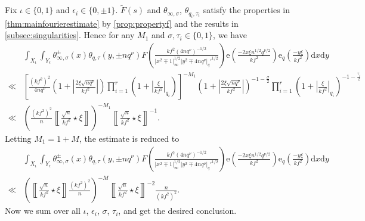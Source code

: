 \documentclass[10pt,oneside,reqno]{amsart}
\makeatletter
\newcommand\rmd{\mathrm{d}}
\newcommand\rme{\mathrm{e}}
\newcommand\legendresymbol[2]{\genfrac{(}{)}{}{}{#1}{#2}}
\theoremstyle{THEOREM}
\theoremstyle{DEFINITION}
\theoremstyle{EXERCISE}
\numberwithin{equation}{section}
\renewenvironment{proof}[1][\proofname]{\par
  \vspace{-6pt}
  \pushQED{\qed}
  \normalfont \topsep6\p@\@plus6\p@\relax
  \trivlist
  \item[\hskip\labelsep\rmfamily\bfseries
    #1\@addpunct{:}]\ignorespaces
}{
  \popQED\endtrivlist\@endpefalse
  \vspace{-6pt}
}
\makeatother
\begin{document}
\begin{proof}
Fix $\iota\in\{0,1\}$ and $\epsilon_i\in \{0,\pm 1\}$.
$\widetilde{F}(s)$ and $\theta_{\infty,\sigma}$, $\theta_{q_i,\tau_i}$ satisfy the properties in \autoref{thm:mainfourierestimate} by \autoref{prop:propertyf} and the results in \autoref{subsec:singularities}. Hence for any $M_1$ and $\sigma,\tau_i\in \{0,1\}$, we have
\begin{align*}
&\int_{X_\iota}\int_{Y_\epsilon}\theta_{\infty,\sigma}^\pm(x)\theta_{q,\tau}(y,\pm nq^\nu) F\legendresymbol{kf^2(4nq^\nu)^{-1/2}}{|x^2\mp 1|_\infty^{1/2}|y^2\mp 4nq^\nu|_q'^{1/2}} \rme\legendresymbol{-2x\xi n^{1/2}q^{\nu/2}}{kf^2}\rme_{q}\legendresymbol{-y\xi}{kf^2}\rmd x\rmd y\\
\ll &\left[\frac{(kf^2)^2}{4nq^\nu}\left(1+\left|\frac{2\xi\sqrt{nq^\nu}}{kf^2}\right|\right) \prod_{i=1}^{r}\left(1+\left|\frac{\xi}{kf^2}\right|_{q_i}\right)\right]^{-M_1} \left(1+\left|\frac{2\xi\sqrt{nq^\nu}}{kf^2}\right|\right)^{-1-\frac{\sigma}{2}} \prod_{i=1}^{r}\left(1+\left|\frac{\xi}{kf^2}\right|_{q_i}\right)^{-1-\frac{\tau_i}{2}}\\
\ll & \left(\frac{(kf^2)^2}{n}\left\llbracket\frac{\sqrt{n}}{kf^2}\star \xi\right\rrbracket\right) ^{-M_1}\left\llbracket\frac{\sqrt{n}}{kf^2}\star \xi\right\rrbracket^{-1}.
\end{align*}
Letting $M_1=1+M$, the estimate is reduced to
\begin{align*}
&\int_{X_\iota}\int_{Y_\epsilon}\theta_{\infty,\sigma}^\pm(x)\theta_{q,\tau}(y,\pm nq^\nu) F\legendresymbol{kf^2(4nq^\nu)^{-1/2}}{|x^2\mp 1|_\infty^{1/2}|y^2\mp 4nq^\nu|_q'^{1/2}} \rme\legendresymbol{-2x\xi n^{1/2}q^{\nu/2}}{kf^2}\rme_{q}\legendresymbol{-y\xi}{kf^2}\rmd x\rmd y\\
\ll &\left(\left\llbracket\frac{\sqrt{n}}{kf^2}\star \xi\right\rrbracket\frac {(kf^2)^2}{n}\right)^{-M}\left\llbracket\frac{\sqrt{n}}{kf^2}\star \xi\right\rrbracket^{-2}\frac{n}{(kf^2)^2}.
\end{align*}
Now we sum over all $\iota$, $\epsilon_i$, $\sigma$, $\tau_i$, and get the desired conclusion.
\end{proof}
\end{document}

